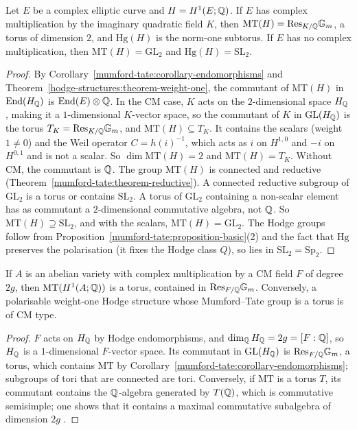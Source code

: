 \begin{proposition}\label{mumford-tate:proposition-elliptic-curves}
Let $E$ be a complex elliptic curve and $H = H^1(E; \mathbb{Q})$. If $E$ has complex multiplication by the imaginary quadratic field $K$, then $\mathrm{MT}(H) = \mathrm{Res}_{K/\mathbb{Q}}\mathbb{G}_m$, a torus of
dimension $2$, and $\mathrm{Hg}(H)$ is the norm-one subtorus. If $E$ has no complex multiplication, then $\mathrm{MT}(H) = \mathrm{GL}_2$ and $\mathrm{Hg}(H) = \mathrm{SL}_2$.
\end{proposition}

\begin{proof}
By Corollary~\ref{mumford-tate:corollary-endomorphisms} and Theorem~\ref{hodge-structures:theorem-weight-one}, the commutant of $\mathrm{MT}(H)$ in $\operatorname{End}(H_{\mathbb{Q}})$ is $\operatorname{End}(E) \otimes \mathbb{Q}$. In the CM case, $K$
acts on the $2$-dimensional space $H_{\mathbb{Q}}$, making it a $1$-dimensional $K$-vector space, so the commutant of $K$ in $\mathrm{GL}(H_{\mathbb{Q}})$ is the torus $T_K = \mathrm{Res}_{K/\mathbb{Q}}\mathbb{G}_m$, and
$\mathrm{MT}(H) \subseteq T_K$. It contains the scalars (weight $1 \neq 0$) and the Weil operator $C = h(i)^{-1}$, which acts as $i$ on $H^{1,0}$ and $-i$ on $H^{0,1}$ and is not a scalar. So
$\dim\mathrm{MT}(H) = 2$ and $\mathrm{MT}(H) = T_K$. Without CM, the commutant is $\mathbb{Q}$. The group $\mathrm{MT}(H)$ is connected and reductive (Theorem~\ref{mumford-tate:theorem-reductive}). A
connected reductive subgroup of $\mathrm{GL}_2$ is a torus or contains $\mathrm{SL}_2$. A torus of $\mathrm{GL}_2$ containing a non-scalar element has as commutant a $2$-dimensional commutative
algebra, not $\mathbb{Q}$. So $\mathrm{MT}(H) \supseteq \mathrm{SL}_2$, and with the scalars, $\mathrm{MT}(H) = \mathrm{GL}_2$. The Hodge groups follow from Proposition~\ref{mumford-tate:proposition-basic}(2)
and the fact that $\mathrm{Hg}$ preserves the polarisation (it fixes the Hodge class $Q$), so lies in $\mathrm{SL}_2 = \mathrm{Sp}_2$.
\end{proof}

\begin{proposition}\label{mumford-tate:proposition-cm}
If $A$ is an abelian variety with complex multiplication by a CM field $F$ of degree $2g$, then $\mathrm{MT}(H^1(A; \mathbb{Q}))$ is a torus, contained in $\mathrm{Res}_{F/\mathbb{Q}}\mathbb{G}_m$. Conversely, a
polarisable weight-one Hodge structure whose Mumford--Tate group is a torus is of CM type.
\end{proposition}

\begin{proof}
$F$ acts on $H_{\mathbb{Q}}$ by Hodge endomorphisms, and $\dim_{\mathbb{Q}} H_{\mathbb{Q}} = 2g = [F : \mathbb{Q}]$, so $H_{\mathbb{Q}}$ is a $1$-dimensional $F$-vector space. Its commutant in $\mathrm{GL}(H_{\mathbb{Q}})$ is $\mathrm{Res}_{F/\mathbb{Q}}\mathbb{G}_m$, a
torus, which contains $\mathrm{MT}$ by Corollary~\ref{mumford-tate:corollary-endomorphisms}; subgroups of tori that are connected are tori. Conversely, if $\mathrm{MT}$ is a torus $T$, its commutant
contains the $\mathbb{Q}$-algebra generated by $T(\mathbb{Q})$, which is commutative semisimple; one shows that it contains a maximal commutative subalgebra of dimension $2g$ \cite{birkenhake-lange}.
\end{proof}

